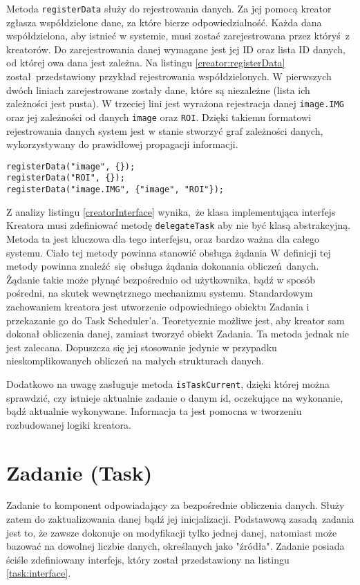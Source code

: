 Metoda \lstinline$registerData$ służy do rejestrowania danych. Za jej pomocą kreator zgłasza współdzielone dane, za które bierze odpowiedzialność. Każda dana współdzielona, aby istnieć w systemie, musi zostać zarejestrowana przez któryś z kreatorów. Do zarejestrowania danej wymagane jest jej ID oraz lista ID danych, od której owa dana jest zależna. Na listingu \ref{creator:registerData} został przedstawiony przykład rejestrowania współdzielonych. W pierwszych dwóch liniach zarejestrowane zostały dane, które są niezależne (lista ich zależności jest pusta). W trzeciej lini jest wyrażona rejestracja danej \lstinline$image.IMG$ oraz jej zależności od danych \lstinline$image$ oraz \lstinline$ROI$. Dzięki takiemu formatowi rejestrowania danych system jest w stanie stworzyć graf zależności danych, wykorzystywany do prawidłowej propagacji informacji.

\begin{minipage}{\textwidth}
	\begin{lstlisting}[label=creator:registerData, caption={Przykłady rejestrowania danych},alsoletter={()[].=}]
registerData("image", {});
registerData("ROI", {});
registerData("image.IMG", {"image", "ROI"});
	\end{lstlisting}
\end{minipage}

Z analizy listingu \ref{creatorInterface} wynika, że klasa implementująca interfejs Kreatora musi zdefiniować metodę \lstinline$delegateTask$ aby nie być klasą abstrakcyjną. Metoda ta jest kluczowa dla tego interfejsu, oraz bardzo ważna dla całego systemu. Ciało tej metody powinna stanowić obsługa żądania W definicji tej metody powinna znaleźć się obsługa żądania dokonania obliczeń danych. Żądanie takie może płynąć bezpośrednio od użytkownika, bądź w sposób pośredni, na skutek wewnętrznego mechanizmu systemu. Standardowym zachowaniem kreatora jest utworzenie odpowiedniego obiektu Zadania i przekazanie go do Task Scheduler'a. Teoretycznie możliwe jest, aby kreator sam dokonał obliczenia danej, zamiast tworzyć obiekt Zadania. Ta metoda jednak nie jest zalecana. Dopuszcza się jej stosowanie jedynie w przypadku nieskomplikowanych obliczeń na małych strukturach danych. 

Dodatkowo na uwagę zasługuje metoda \lstinline$isTaskCurrent$, dzięki której można sprawdzić, czy istnieje aktualnie zadanie o danym id, oczekujące na wykonanie, bądź aktualnie wykonywane. Informacja ta jest pomocna w tworzeniu rozbudowanej logiki kreatora.

\section{Zadanie (Task)}
Zadanie to komponent odpowiadający za bezpośrednie obliczenia danych. Służy zatem do zaktualizowania danej bądź jej inicjalizacji. Podstawową zasadą zadania jest to, że zawsze dokonuje on modyfikacji tylko jednej danej, natomiast może bazować na dowolnej liczbie danych, określanych jako "źródła". Zadanie posiada ściśle zdefiniowany interfejs, który został przedstawiony na listingu \ref{task:interface}.

